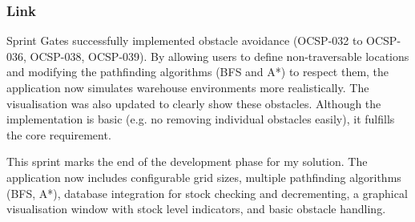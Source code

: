 \subsubsection{Link}
Sprint Gates successfully implemented obstacle avoidance (OCSP-032 to OCSP-036, OCSP-038, OCSP-039). By allowing users to define non-traversable locations and modifying the pathfinding algorithms (BFS and A*) to respect them, the application now simulates warehouse environments more realistically. The visualisation was also updated to clearly show these obstacles. Although the implementation is basic (e.g. no removing individual obstacles easily), it fulfills the core requirement.

This sprint marks the end of the development phase for my solution. The application now includes configurable grid sizes, multiple pathfinding algorithms (BFS, A*), database integration for stock checking and decrementing, a graphical visualisation window with stock level indicators, and basic obstacle handling.


